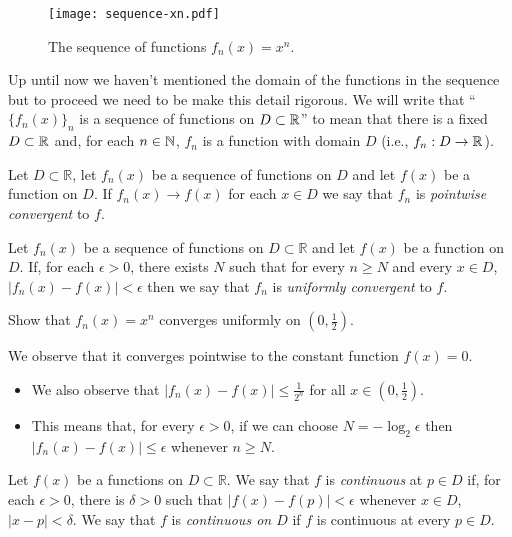 \begin{figure}
  \begin{center}
    \texttt{[image: sequence-xn.pdf]}
    \caption{The sequence of functions \(f_n(x)= x^n\).}
  \end{center}
\end{figure}

\noindent
Up until now we haven't mentioned the domain of the functions in the sequence but to proceed we need to be make this detail rigorous.
We will write that ``\({\{f_n(x)\}}_{n}\) is a sequence of functions on \(D\subset \mathbb{R}\)'' to mean that there is a fixed \(D\subset \mathbb{R}\) and, for each \(n\in \mathbb{N}\), \(f_{n}\) is a function with domain \(D\) (i.e., \(f_n : D \to \mathbb{R}\)).


\begin{definition}
  Let \(D\subset \mathbb{R}\),
  let \(f_n(x)\) be a sequence of functions on \(D\)
  and let \(f(x)\) be a function on \(D\).
  If \(f_n(x) \to f(x)\) for each \(x\in D\) we say that \(f_n\) is \emph{pointwise convergent} to \(f\).
\end{definition}

\begin{definition}
  Let \(f_n(x)\) be a sequence of functions on \(D\subset \mathbb{R}\)
  and let \(f(x)\) be a function on \(D\).
  If, for each \(\epsilon>0\), there exists \(N\) such that for every \(n\geq N\) and every \(x\in D\), \(|f_n(x) - f(x)| < \epsilon\) then we say that \(f_n\) is \emph{uniformly convergent} to \(f\).
\end{definition}

\begin{example*}
  Show that \(f_n(x) = x^n\) converges uniformly on \((0,\frac{1}{2})\).
\end{example*}

\begin{solution}
  We observe that it converges pointwise to the constant function \(f(x)=0\).
  \begin{itemize}
    \item We also observe that \(|f_n(x) - f(x) | \leq \frac{1}{2^n}\) for all \(x\in (0,\frac{1}{2})\).
    \item This means that, for every \(\epsilon>0\), if we can choose \(N=-\log_{2}\epsilon\) then \(|f_n(x) - f(x) | \leq \epsilon\) whenever \(n\geq N\).
  \end{itemize}
\end{solution}


\begin{definition}
  Let \(f(x)\) be a functions on \(D\subset \mathbb{R}\).
  We say that \(f\) is \emph{continuous} at \(p\in D\) if, for each \(\epsilon>0\), there is \(\delta >0\) such that \(|f(x)-f(p)| <\epsilon\) whenever \(x\in D\), \(|x-p| <\delta\).
  We say that \(f\) is \emph{continuous on \( D\)} if \(f\) is continuous at every \(p\in D\).
\end{definition}




